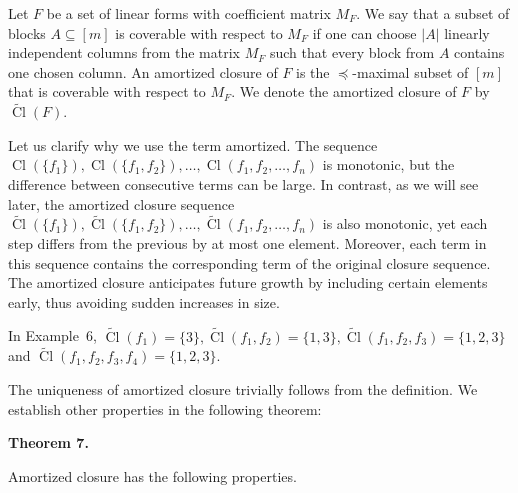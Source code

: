 \documentclass[10pt,a4paper]{article}
\begin{document}
Let $F$ be a set of linear forms with coefficient matrix $M_{F}$. We say that a subset of blocks $A\subseteq[m]$ is coverable with respect to $M_{F}$ if one can choose $|A|$ linearly independent columns from the matrix $M_{F}$ such that every block from $A$ contains one chosen column. An amortized closure of $F$ is the $\preceq$-maximal subset of $[m]$ that is coverable with respect to $M_{F}$. We denote the amortized closure of $F$ by $\widetilde{\mathop{\mathrm{Cl}}}(F)$.\par



Let us clarify why we use the term amortized. The sequence $\mathop{\mathrm{Cl}}(\{f_{1}\}),\mathop{\mathrm{Cl}}(\{f_{1},f_{2}\}),\dots,\mathop{\mathrm{Cl}}(f_{1},f_{2},\dots,f_{n})$ is monotonic, but the difference between consecutive terms can be large. In contrast, as we will see later, the amortized closure sequence $\widetilde{\mathop{\mathrm{Cl}}}(\{f_{1}\}),\widetilde{\mathop{\mathrm{Cl}}}(\{f_{1},f_{2}\}),\dots,\widetilde{\mathop{\mathrm{Cl}}}(f_{1},f_{2},\dots,f_{n})$ is also monotonic, yet each step differs from the previous by at most one element. Moreover, each term in this sequence contains the corresponding term of the original closure sequence. The amortized closure anticipates future growth by including certain elements early, thus avoiding sudden increases in size.\par



In Example 6, $\widetilde{\mathop{\mathrm{Cl}}}(f_{1})=\{3\},\widetilde{\mathop{\mathrm{Cl}}}(f_{1},f_{2})=\{1,3\},\widetilde{\mathop{\mathrm{Cl}}}(f_{1},f_{2},f_{3})=\{1,2,3\}$ and $\widetilde{\mathop{\mathrm{Cl}}}(f_{1},f_{2},f_{3},f_{4})=\{1,2,3\}$.\par



The uniqueness of amortized closure trivially follows from the definition. We establish other properties in the following theorem:\par



\par\medskip\noindent\textbf{
Theorem 7.
}\par



Amortized closure has the following properties.\par
\end{document}
